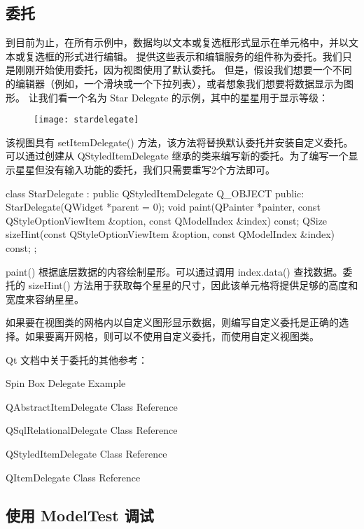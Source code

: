 \subsection{委托}

到目前为止，在所有示例中，数据均以文本或复选框形式显示在单元格中，并以文本或复选框的形式进行编辑。
提供这些表示和编辑服务的组件称为委托。我们只是刚刚开始使用委托，因为视图使用了默认委托。
但是，假设我们想要一个不同的编辑器（例如，一个滑块或一个下拉列表），或者想象我们想要将数据显示为图形。
让我们看一个名为 Star Delegate 的示例，其中的星星用于显示等级：


\begin{figure}[hbt!]  
\texttt{[image: stardelegate]}
\end{figure}

该视图具有 setItemDelegate() 方法，该方法将替换默认委托并安装自定义委托。
可以通过创建从 QStyledItemDelegate 继承的类来编写新的委托。为了编写一个显示星星但没有输入功能的委托，我们只需要重写2个方法即可。


\begin{cppcode}
class StarDelegate : public QStyledItemDelegate
{
    Q_OBJECT
public:
    StarDelegate(QWidget *parent = 0);
    void paint(QPainter *painter, const QStyleOptionViewItem &option,
               const QModelIndex &index) const;
    QSize sizeHint(const QStyleOptionViewItem &option,
                   const QModelIndex &index) const;
};
\end{cppcode}

paint() 根据底层数据的内容绘制星形。可以通过调用 index.data() 查找数据。委托的 sizeHint() 方法用于获取每个星星的尺寸，因此该单元格将提供足够的高度和宽度来容纳星星。

如果要在视图类的网格内以自定义图形显示数据，则编写自定义委托是正确的选择。如果要离开网格，则可以不使用自定义委托，而使用自定义视图类。

Qt 文档中关于委托的其他参考：

\begin{compactitem}
\item Spin Box Delegate Example
\item QAbstractItemDelegate Class Reference
\item QSqlRelationalDelegate Class Reference
\item QStyledItemDelegate Class Reference
\item QItemDelegate Class Reference
\end{compactitem}

\subsection{使用 ModelTest 调试}

